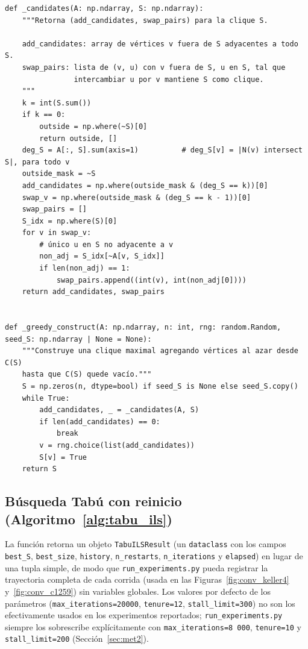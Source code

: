 {\footnotesize
\begin{verbatim}
def _candidates(A: np.ndarray, S: np.ndarray):
    """Retorna (add_candidates, swap_pairs) para la clique S.

    add_candidates: array de vértices v fuera de S adyacentes a todo S.
    swap_pairs: lista de (v, u) con v fuera de S, u en S, tal que
                intercambiar u por v mantiene S como clique.
    """
    k = int(S.sum())
    if k == 0:
        outside = np.where(~S)[0]
        return outside, []
    deg_S = A[:, S].sum(axis=1)          # deg_S[v] = |N(v) intersect S|, para todo v
    outside_mask = ~S
    add_candidates = np.where(outside_mask & (deg_S == k))[0]
    swap_v = np.where(outside_mask & (deg_S == k - 1))[0]
    swap_pairs = []
    S_idx = np.where(S)[0]
    for v in swap_v:
        # único u en S no adyacente a v
        non_adj = S_idx[~A[v, S_idx]]
        if len(non_adj) == 1:
            swap_pairs.append((int(v), int(non_adj[0])))
    return add_candidates, swap_pairs


def _greedy_construct(A: np.ndarray, n: int, rng: random.Random, seed_S: np.ndarray | None = None):
    """Construye una clique maximal agregando vértices al azar desde C(S)
    hasta que C(S) quede vacío."""
    S = np.zeros(n, dtype=bool) if seed_S is None else seed_S.copy()
    while True:
        add_candidates, _ = _candidates(A, S)
        if len(add_candidates) == 0:
            break
        v = rng.choice(list(add_candidates))
        S[v] = True
    return S
\end{verbatim}
}

\subsection{Búsqueda Tabú con reinicio (Algoritmo~\ref{alg:tabu_ils})}

La función retorna un objeto \texttt{TabuILSResult} (un \texttt{dataclass} con los campos \texttt{best\_S}, \texttt{best\_size}, \texttt{history}, \texttt{n\_restarts}, \texttt{n\_iterations} y \texttt{elapsed}) en lugar de una tupla simple, de modo que \texttt{run\_experiments.py} pueda registrar la trayectoria completa de cada corrida (usada en las Figuras~\ref{fig:conv_keller4} y~\ref{fig:conv_c1259}) sin variables globales. Los valores por defecto de los parámetros (\texttt{max\_iterations=20000}, \texttt{tenure=12}, \texttt{stall\_limit=300}) no son los efectivamente usados en los experimentos reportados; \texttt{run\_experiments.py} siempre los sobrescribe explícitamente con \texttt{max\_iterations=8\,000}, \texttt{tenure=10} y \texttt{stall\_limit=200} (Sección~\ref{sec:met2}).

